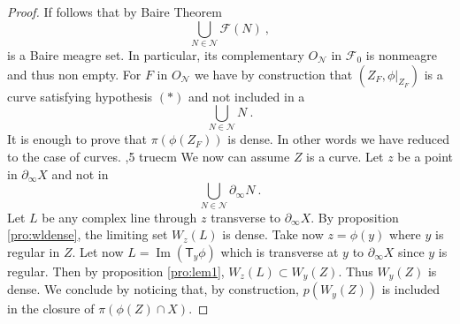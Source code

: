 \documentclass[12pt,reqno]{amsart}
\newcommand{\T}{\ms T}
\newcommand{\ms}{\mathsf}
\newcommand{\mc}{\mathcal}
\newcommand{\bX}{\partial_\infty X}
\newcommand{\im}{\operatorname{Im}}
\begin{document}
\begin{proof}
If follows that by Baire Theorem
$$
\bigcup_{N\in\mc N}{\mc F}(N)\ ,
$$
 is a Baire meagre set. In particular, its complementary $O_{\mc N}$ in $\mc F_0$ is nonmeagre and thus non empty. For $F$ in  $O_{\mc N}$ we have by construction that $(Z_F,\phi\vert_{Z_F})$ is a curve satisfying hypothesis $(*)$ and not included in a 
 $$
\bigcup_{N\in\mc N} N\ .
 $$
It is enough to prove that $\pi(\phi(Z_F))$ is dense. In other words we have reduced to the case of curves. 
,5 truecm
 We now can assume $Z$ is a curve. Let $z$ be a point in $\bX$ and not in 
$$
\bigcup_{N\in\mc N}\partial_\infty N\ .
$$ 
Let $L$ be any complex line through $z$ transverse to $\bX$. By proposition \ref{pro:wldense}, the limiting set $W_z(L)$ is dense. Take now $z=\phi(y)$ where $y$ is regular in $Z$. Let now $L=\im(\T_y\phi)$ which is transverse at $y$ to $\bX$ since $y$ is regular. Then by proposition \ref{pro:lem1},
$W_z(L)\subset W_y(Z)$. Thus $W_y(Z)$ is dense. We conclude  by noticing that, by construction,  $p(W_y(Z))$ is included in the closure of  $\pi(\phi(Z)\cap X)$.
	\end{proof}
\end{document}
